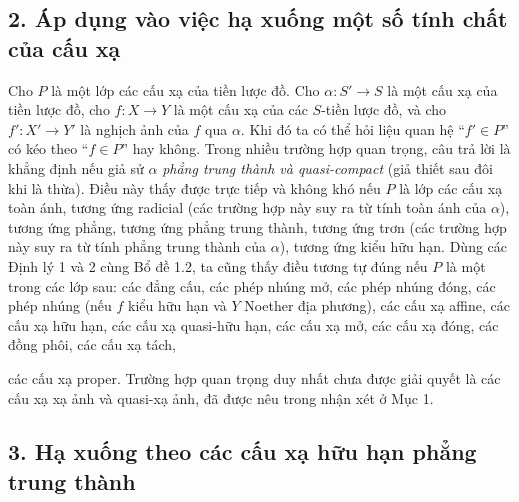 \documentclass[11pt,twoside,openany]{book}
\numberwithin{equation}{section}
\newcommand{\src}[1]{%
  \phantomsection\hypertarget{src:\fgasourceid:#1}{}%
  \marginpar{\raggedleft\footnotesize\sffamily #1}%
}
\newcommand{\fgasourceid}{unset}
\begin{document}
\subsection*{2. Áp dụng vào việc hạ xuống một số tính chất của cấu xạ}

Cho $P$ là một lớp các cấu xạ của tiền lược đồ. Cho
$\alpha:S'\longrightarrow S$ là một cấu xạ của tiền lược đồ, cho
$f:X\longrightarrow Y$ là một cấu xạ của các $S$-tiền lược đồ, và cho
$f':X'\longrightarrow Y'$ là nghịch ảnh của $f$ qua $\alpha$. Khi đó ta có thể
hỏi liệu quan hệ ``$f'\in P$'' có kéo theo ``$f\in P$'' hay không. Trong nhiều
trường hợp quan trọng, câu trả lời là khẳng định nếu giả sử $\alpha$
\emph{phẳng trung thành và quasi-compact} (giả thiết sau đôi khi là thừa). Điều
này thấy được trực tiếp và không khó nếu $P$ là lớp các cấu xạ toàn ánh, tương
ứng radicial (các trường hợp này suy ra từ tính toàn ánh của $\alpha$), tương
ứng phẳng, tương ứng phẳng trung thành, tương ứng trơn (các trường hợp này suy
ra từ tính phẳng trung thành của $\alpha$), tương ứng kiểu hữu hạn. Dùng các
Định lý 1 và 2 cùng Bổ đề 1.2, ta cũng thấy điều tương tự đúng nếu $P$ là một
trong các lớp sau: các đẳng cấu, các phép nhúng mở, các phép nhúng đóng, các
phép nhúng (nếu $f$ kiểu hữu hạn và $Y$ Noether địa phương), các cấu xạ affine,
các cấu xạ hữu hạn, các cấu xạ quasi-hữu hạn, các cấu xạ mở, các cấu xạ đóng,
các đồng phôi, các cấu xạ tách,

\src{319}
các cấu xạ proper. Trường hợp quan trọng duy nhất chưa được giải quyết là các
cấu xạ xạ ảnh và quasi-xạ ảnh, đã được nêu trong nhận xét ở Mục 1.

\subsection*{3. Hạ xuống theo các cấu xạ hữu hạn phẳng trung thành}
\end{document}
